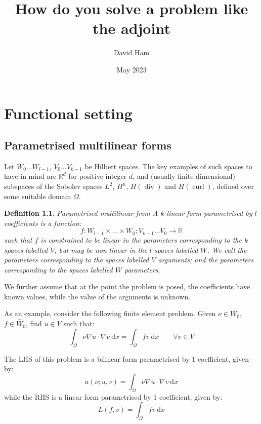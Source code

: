 \documentclass[a4paper,12pt]{report}
\title{How do you solve a problem like the adjoint}
\author{David Ham}
\date{May 2023}
\newtheorem{definition}[chapter]{Definition}
\begin{document}
\maketitle

\chapter{Functional setting}

\section{Parametrised multilinear forms}

Let $W_0\ldots W_{l-1}$, $V_0\ldots V_{k-1}$ be Hilbert spaces. The key examples of
such spaces to have in mind are $\mathbb{R}^d$ for positive integer $d$, and
(usually finite-dimensional) subspaces of the Sobolev spaces $L^2$, $H^n$,
$H(\operatorname{div})$ and $H(\operatorname{curl})$, defined over some
suitable domain $\Omega$.

\begin{definition}{Parametrised multilinear from}
    A $k$-linear form parametrised by $l$ coefficients is a function:
    \[
      f: W_{l-1} \times \ldots \times W_{0}; V_{k-1}\ldots V_{0} \rightarrow \mathbb{R}
    \]
    such that $f$ is constrained to be linear in the parameters corresponding
    to the $k$ spaces labelled $V$, but may be non-linear in the $l$ spaces
    labelled $W$. We call the parameters corresponding to the spaces labelled
    $V$ \emph{arguments}; and the parameters corresponding to the spaces
    labelled $W$ \emph{parameters}. 
\end{definition}
We further assume that at the point the problem is posed, the coefficients have
known values, while the value of the arguments is unknown.

As an example, consider the following finite element problem. 
Given $\nu\in W_0$, $f\in \hat{W}_0$, find $u \in V$ such that:
\begin{equation}
    \int_\Omega \nu\nabla u \cdot \nabla v\ \mathrm{d}x = 
    \int_\Omega f v\ \mathrm{d}x\qquad \forall v \in V
\end{equation}

The LHS of this problem is a bilinear form parametrised by 1 coefficient, given
by:
\begin{equation}
    a(\nu; u, v) = \int_\Omega \nu\nabla u \cdot \nabla v\ \mathrm{d}x
\end{equation}
while the RHS is a linear form parametrised by 1 coefficient, given by:
\begin{equation}
    L(f, v) = \int_\Omega fv\ \mathrm{d}x
\end{equation}
\end{document}
